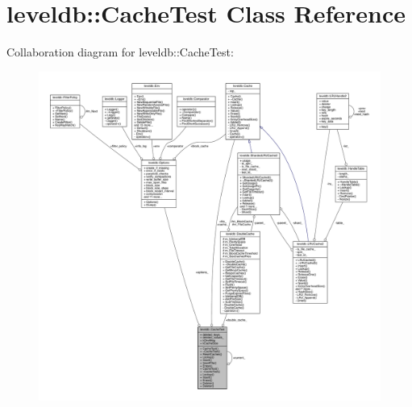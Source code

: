 \hypertarget{classleveldb_1_1_cache_test}{}\section{leveldb\+:\+:Cache\+Test Class Reference}
\label{classleveldb_1_1_cache_test}


Collaboration diagram for leveldb\+:\+:Cache\+Test\+:
\nopagebreak
\begin{figure}[H]
\begin{center}
\leavevmode
\includegraphics[width=350pt]{classleveldb_1_1_cache_test__coll__graph}
\end{center}
\end{figure}
